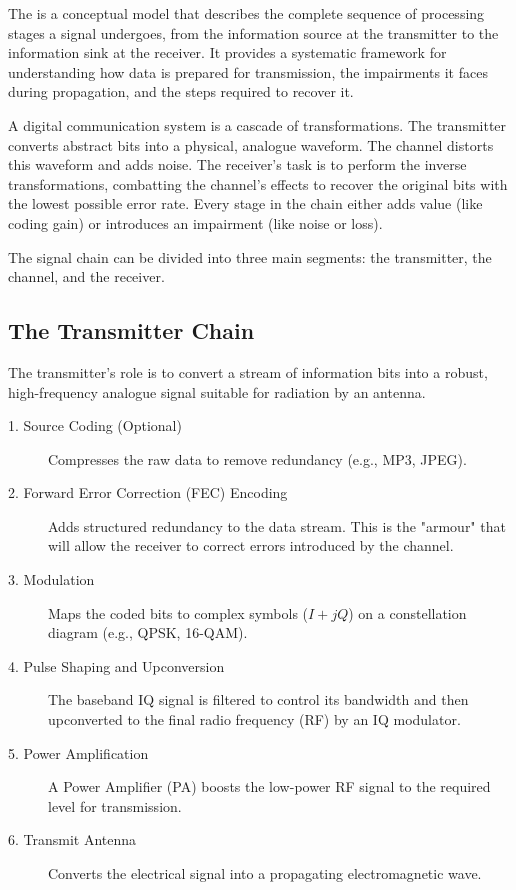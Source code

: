 The  is a conceptual model that describes the complete sequence of processing stages a signal undergoes, from the information source at the transmitter to the information sink at the receiver. It provides a systematic framework for understanding how data is prepared for transmission, the impairments it faces during propagation, and the steps required to recover it.

\begin{keyconcept}
    A digital communication system is a cascade of transformations. The transmitter converts abstract bits into a physical, analogue waveform. The channel distorts this waveform and adds noise. The receiver's task is to perform the inverse transformations, combatting the channel's effects to recover the original bits with the lowest possible error rate. Every stage in the chain either adds value (like coding gain) or introduces an impairment (like noise or loss).
\end{keyconcept}

The signal chain can be divided into three main segments: the transmitter, the channel, and the receiver.


\subsection{The Transmitter Chain}

The transmitter's role is to convert a stream of information bits into a robust, high-frequency analogue signal suitable for radiation by an antenna.

\begin{description}
    \item[1. Source Coding (Optional)] Compresses the raw data to remove redundancy (e.g., MP3, JPEG).
    \item[2. Forward Error Correction (FEC) Encoding] Adds structured redundancy to the data stream. This is the "armour" that will allow the receiver to correct errors introduced by the channel.
    \item[3. Modulation] Maps the coded bits to complex symbols ($I+jQ$) on a constellation diagram (e.g., QPSK, 16-QAM).
    \item[4. Pulse Shaping and Upconversion] The baseband IQ signal is filtered to control its bandwidth and then upconverted to the final radio frequency (RF) by an IQ modulator.
    \item[5. Power Amplification] A Power Amplifier (PA) boosts the low-power RF signal to the required level for transmission.
    \item[6. Transmit Antenna] Converts the electrical signal into a propagating electromagnetic wave.
\end{description}


